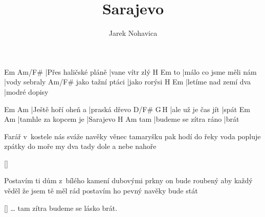 \documentclass{song}
\title{Sarajevo}
\author{Jarek Nohavica}
\begin{document}
\strophe
Em                   Am/F\#
|Přes haličské pláně |vane vítr zlý
   H\7                    Em
to |málo co jsme měli nám |vody sebraly
                 Am/F\#
jako tažní ptáci |jako rorýsi
H\7                  Em
|letíme nad zemí dva |modré dopisy
\endstrophe

Em                 Am
|Ještě hoří oheň a |praská dřevo
D\7/F\#            G\,H\7
|ale už je čas jít |spát
Em                   Am
|tamhle za kopcem je |Sarajevo
    H\7                   Am
tam |budeme se zítra ráno |brát
\endstrophe

\strophe*
Farář v~kostele nás sváže navěky
věnec tamaryšku pak hodí do řeky
voda popluje zpátky do moře
my dva tady dole a nebe nahoře
\endstrophe

\ref{}

\strophe*
Postavím ti dům z~bílého kamení
dubovými prkny on bude roubený
aby každý věděl že jsem tě měl rád
postavím ho pevný navěky bude stát
\endstrophe

\ref{} \ldots{} tam zítra budeme se lásko brát.
\end{document}
